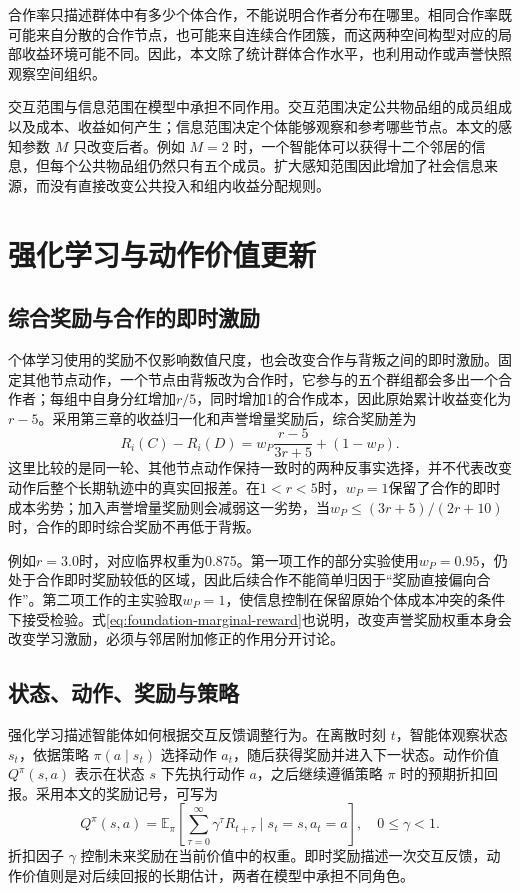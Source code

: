 合作率只描述群体中有多少个体合作，不能说明合作者分布在哪里。相同合作率既可能来自分散的合作节点，也可能来自连续合作团簇，而这两种空间构型对应的局部收益环境可能不同。因此，本文除了统计群体合作水平，也利用动作或声誉快照观察空间组织。

交互范围与信息范围在模型中承担不同作用。交互范围决定公共物品组的成员组成以及成本、收益如何产生；信息范围决定个体能够观察和参考哪些节点。本文的感知参数 $M$ 只改变后者。例如 $M=2$ 时，一个智能体可以获得十二个邻居的信息，但每个公共物品组仍然只有五个成员。扩大感知范围因此增加了社会信息来源，而没有直接改变公共投入和组内收益分配规则。

\section{强化学习与动作价值更新}
\subsection{综合奖励与合作的即时激励}

个体学习使用的奖励不仅影响数值尺度，也会改变合作与背叛之间的即时激励。固定其他节点动作，一个节点由背叛改为合作时，它参与的五个群组都会多出一个合作者；每组中自身分红增加$r/5$，同时增加1的合作成本，因此原始累计收益变化为$r-5$。采用第三章的收益归一化和声誉增量奖励后，综合奖励差为
\begin{equation}
 R_i(C)-R_i(D)=w_P\frac{r-5}{3r+5}+(1-w_P).
 \label{eq:foundation-marginal-reward}
\end{equation}
这里比较的是同一轮、其他节点动作保持一致时的两种反事实选择，并不代表改变动作后整个长期轨迹中的真实回报差。在$1<r<5$时，$w_P=1$保留了合作的即时成本劣势；加入声誉增量奖励则会减弱这一劣势，当$w_P\leq(3r+5)/(2r+10)$时，合作的即时综合奖励不再低于背叛。

例如$r=3.0$时，对应临界权重为0.875。第一项工作的部分实验使用$w_P=0.95$，仍处于合作即时奖励较低的区域，因此后续合作不能简单归因于“奖励直接偏向合作”。第二项工作的主实验取$w_P=1$，使信息控制在保留原始个体成本冲突的条件下接受检验。式\eqref{eq:foundation-marginal-reward}也说明，改变声誉奖励权重本身会改变学习激励，必须与邻居附加修正的作用分开讨论。

\subsection{状态、动作、奖励与策略}

强化学习描述智能体如何根据交互反馈调整行为\cite{sutton2018reinforcement}。在离散时刻 $t$，智能体观察状态 $s_t$，依据策略 $\pi(a\mid s_t)$ 选择动作 $a_t$，随后获得奖励并进入下一状态。动作价值 $Q^\pi(s,a)$ 表示在状态 $s$ 下先执行动作 $a$，之后继续遵循策略 $\pi$ 时的预期折扣回报。采用本文的奖励记号，可写为
\begin{equation}
 Q^\pi(s,a)=\mathbb E_\pi\left[\sum_{\tau=0}^{\infty}\gamma^\tau R_{t+\tau}
             \mid s_t=s,a_t=a\right],\quad 0\leq\gamma<1.
 \label{eq:foundation-return}
\end{equation}
折扣因子 $\gamma$ 控制未来奖励在当前价值中的权重。即时奖励描述一次交互反馈，动作价值则是对后续回报的长期估计，两者在模型中承担不同角色。

